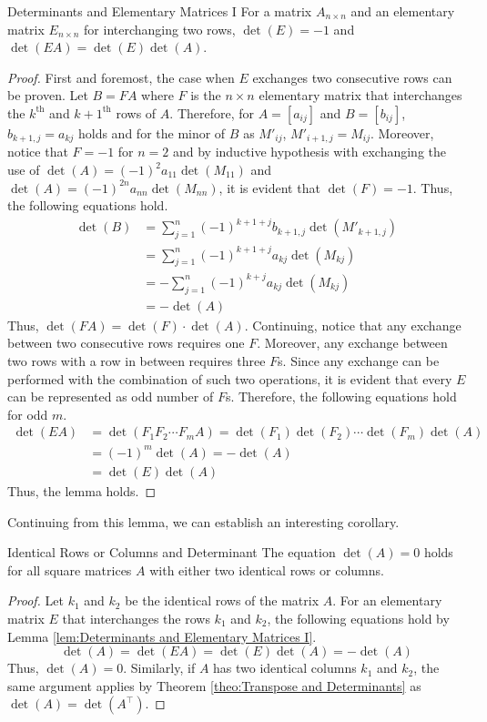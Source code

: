 \documentclass[../../main.tex]{subfiles}
\begin{document}
\begin{lemma}{}{Determinants and Elementary Matrices I}
For a matrix $A_{n \times n}$ and an elementary matrix
$E_{n \times n}$ for interchanging two rows, $\det(E) = -1$
and $\det(EA) = \det(E) \det(A)$.
\end{lemma}
\begin{proof}
First and foremost, the case when $E$ exchanges two consecutive
rows can be proven. Let $B = FA$ where $F$ is the $n \times n$
elementary matrix that interchanges the $k^\text{th}$ and
$k+1^\text{th}$ rows of $A$. Therefore, for $A = [a_{ij}]$ and
$B = [b_{ij}]$, $b_{k+1,j} = a_{kj}$ holds and for the minor of $B$ as
$M'_{ij}$, $M'_{i+1,j} = M_{ij}$. Moreover, notice that $F = -1$ for
$n = 2$ and by inductive hypothesis with exchanging the use of
$\det(A) = (-1)^2 a_{11} \det(M_{11})$ and $\det(A) = (-1)^{2n} a_{nn}
\det(M_{nn})$, it is evident that $\det(F) = -1$. Thus, the following
equations hold.
\begin{align*}
    \det(B)
    &= \sum_{j=1}^n (-1)^{k+1+j} b_{k+1,j} \det(M'_{k+1,j}) \\
    &= \sum_{j=1}^n (-1)^{k+1+j} a_{kj} \det(M_{kj}) \\
    &= -\sum_{j=1}^n (-1)^{k+j} a_{kj} \det(M_{kj}) \\
    &= -\det(A)
\end{align*}
Thus, $\det(FA) = \det(F) \cdot \det(A)$. Continuing, notice that
any exchange between two consecutive rows requires one $F$. Moreover,
any exchange between two rows with a row in between requires three
$F$s. Since any exchange can be performed with the combination of
such two operations, it is evident that every $E$ can be represented
as odd number of $F$s. Therefore, the following equations hold for
odd $m$.
\begin{align*}
    \det(EA)
    &= \det(F_1 F_2 \cdots F_m A)
    = \det(F_1) \det(F_2) \cdots \det(F_m) \det(A) \\
    &= (-1)^m \det(A)
    = -\det(A) \\
    &= \det(E) \det(A)
\end{align*}
Thus, the lemma holds.
\end{proof}

Continuing from this lemma, we can establish an interesting corollary.

\begin{corollary}{}{Identical Rows or Columns and Determinant}
The equation $\det(A) = 0$ holds for all square matrices $A$ with
either two identical rows or columns.
\end{corollary}
\begin{proof}
Let $k_1$ and $k_2$ be the identical rows of the matrix $A$.
For an elementary matrix $E$ that interchanges the rows $k_1$ and
$k_2$, the following equations hold by Lemma \ref{lem:Determinants
and Elementary Matrices I}.
\[
\det(A)
= \det(EA)
= \det(E) \det(A)
= -\det(A)
\]
Thus, $\det(A) = 0$. Similarly, if $A$ has two identical columns
$k_1$ and $k_2$, the same argument applies by Theorem
\ref{theo:Transpose and Determinants} as $\det(A) =
\det(A^\intercal)$.
\end{proof}
\end{document}
